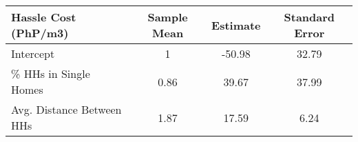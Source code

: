 \begin{tabular}{lccc}
Hassle Cost (PhP/m3) & Sample Mean & Estimate & Standard Error \\
\hline
Intercept & 1 &-50.98 &32.79\\
\% HHs in Single Homes  &0.86&39.67&37.99\\
Avg. Distance Between HHs &1.87&17.59&6.24\\
\hline
\end{tabular} 
